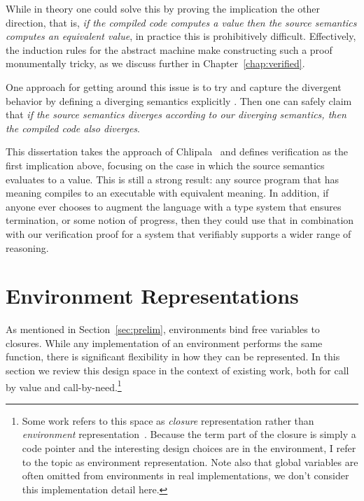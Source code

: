 While in theory one could solve this by proving the implication the other
direction, that is, \emph{if the compiled code computes a value then the source
semantics computes an equivalent value}, in practice this is prohibitively
difficult. Effectively, the induction rules for the abstract machine make
constructing such a proof monumentally tricky, as we discuss further in
Chapter~\ref{chap:verified}.

One approach for getting around this issue is to try and capture the divergent
behavior by defining a diverging semantics explicitly \cite{functionalbigstep}.
Then one can safely claim that \emph{if the source semantics diverges according to
our diverging semantics, then the compiled code also diverges}. 

This dissertation takes the approach of Chlipala~\cite{chlipala2007certified}
and defines verification as the first implication above, focusing on the case in
which the source semantics evaluates to a value. This is still a strong
result: any source program that has meaning compiles to an executable with
equivalent meaning. In addition, if anyone ever chooses to augment the language
with a type system that ensures termination, or some notion of progress, then
they could use that in combination with our verification proof for a system that
verifiably supports a wider range of reasoning.

\section{Environment Representations} \label{sec:env}

As mentioned in Section~\ref{sec:prelim}, environments bind free variables to
closures. While any implementation of an environment performs the same function,
there is significant flexibility in how they can be represented. In this section
we review this design space in the context of existing work, both for call by
value and call-by-need.\footnote{Some work refers to this space as
\emph{closure} representation rather than \emph{environment}
representation~\cite{shao1994space,appel1988optimizing}.  Because the term part
of the closure is simply a code pointer and the interesting design choices are
in the environment, I refer to the topic as environment representation. Note
also that global variables are often omitted from environments in real
implementations, we don't consider this implementation detail here.}

